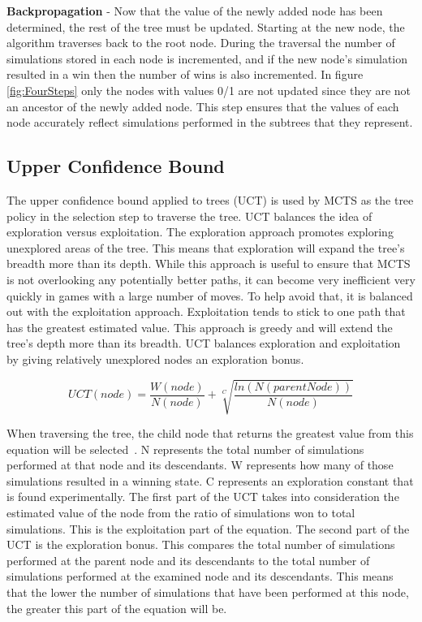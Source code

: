 \documentclass{sig-alternate}
\begin{document}
\textbf{Backpropagation} - Now that the value of the newly added node has been determined, the rest of the tree must be updated. Starting at the new node, the algorithm traverses back to the root node. During the traversal the number of simulations stored in each node is incremented, and if the new node's simulation resulted in a win then the number of wins is also incremented. In figure \ref{fig:FourSteps} only the nodes with values 0/1 are not updated since they are not an ancestor of the newly added node. This step ensures that the values of each node accurately reflect simulations performed in the subtrees that they represent.

\subsection{Upper Confidence Bound}

The upper confidence bound applied to trees (UCT) is used by MCTS as the tree policy in the selection step to traverse the tree. UCT balances the idea of exploration versus exploitation. The exploration approach promotes exploring unexplored areas of the tree. This means that exploration will expand the tree's breadth more than its depth. While this approach is useful to ensure that MCTS is not overlooking any potentially better paths, it can become very inefficient very quickly in games with a large number of moves. To help avoid that, it is balanced out with the exploitation approach. Exploitation tends to stick to one path that has the greatest estimated value. This approach is greedy and will extend the tree's depth more than its breadth. UCT balances exploration and exploitation by giving relatively unexplored nodes an exploration bonus.  

 \begin{equation*}
 \label{UCTequation}
 UCT(node) = \frac{W(node)}{N(node)} + \sqrt[C]{\frac{ln(N(parentNode))}{N(node)}}
 \end{equation*}

When traversing the tree, the child node that returns the greatest value from this equation will be selected~\cite{ActionSelection}. N represents the total number of simulations performed at that node and its descendants. W represents how many of those simulations resulted in a winning state. C represents an exploration constant that is found experimentally. The first part of the UCT takes into consideration the estimated value of the node from the ratio of simulations won to total simulations. This is the exploitation part of the equation. The second part of the UCT is the exploration bonus. This compares the total number of simulations performed at the parent node and its descendants to the total number of simulations performed at the examined node and its descendants. This means that the lower the number of simulations that have been performed at this node, the greater this part of the equation will be. 
\end{document}
